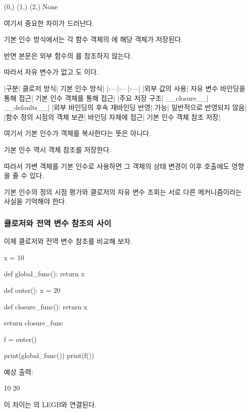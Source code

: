 \begin{dhkzsh}
(0,)
(1,)
(2,)
None
\end{dhkzsh}

여기서 중요한 차이가 드러난다.

기본 인수 방식에서는 각 함수 객체의 에 해당 객체가 저장된다.

반면  본문은 외부 함수의 를 참조하지 않는다.

따라서 자유 변수가 없고 도 이다.

\begin{dhktable}
|구분|	클로저 방식|	기본 인수 방식|
|:---|:---|:---|
|외부 값의 사용|	자유 변수 바인딩을 통해 접근|	기본 인수 객체를 통해 접근|
|주요 저장 구조|	__closure__|	__defaults__|
|외부 바인딩의 후속 재바인딩 반영|	가능|	일반적으로 반영되지 않음|
|함수 정의 시점의 객체 보관|	바인딩 자체에 접근|	기본 인수 객체 참조 저장|
\end{dhktable}

여기서 기본 인수가 객체를 복사한다는 뜻은 아니다.

기본 인수 역시 객체 참조를 저장한다.

따라서 가변 객체를 기본 인수로 사용하면 그 객체의 상태 변경이 이후 호출에도 영향을 줄 수 있다.

기본 인수의 정의 시점 평가와 클로저의 자유 변수 조회는 서로 다른 메커니즘이라는 사실을 기억해야 한다.

\subsubsection{클로저와 전역 변수 참조의 사이}

이제 클로저와 전역 변수 참조를 비교해 보자.

\begin{dhkcode}
x = 10


def global_func():
    return x


def outer():
    x = 20

    def closure_func():
        return x

    return closure_func


f = outer()

print(global_func())
print(f())
\end{dhkcode}

예상 출력:

\begin{dhkzsh}
10
20
\end{dhkzsh}

이 차이는 의 LEGB와 연결된다.

